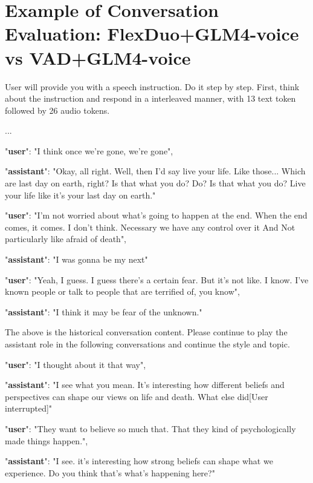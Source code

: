 \documentclass[11pt]{article}
\begin{document}
\section{Example of Conversation Evaluation: FlexDuo+GLM4-voice vs VAD+GLM4-voice}
\label{sec:appendix}
\begin{tcolorbox}[colback=yellow!10, colframe=red!80!black, title=System prompt for GLM4-voice ]
User will provide you with a speech instruction. Do it step by step. First, think about the instruction and respond in a interleaved manner, with 13 text token followed by 26 audio tokens. 

...

    "\textbf{user}": "I think once we're gone, we're gone",
    
    "\textbf{assistant}": "Okay, all right. Well, then I'd say live your life. Like those... Which are last day on earth, right? Is that what you do? Do? Is that what you do? Live your life like it's your last day on earth."

    "\textbf{user}": "I'm not worried about what's going to happen at the end. When the end comes, it comes. I don't think. Necessary we have any control over it And Not particularly like afraid of death",
    
    "\textbf{assistant}": "I was gonna be my next"

    "\textbf{user}": "Yeah, I guess. I guess there's a certain fear. But it's not like. I know. I've known people or talk to people that are terrified of, you know",
    
    "\textbf{assistant}": "I think it may be fear of the unknown."

The above is the historical conversation content. Please continue to play the assistant role in the following conversations and continue the style and topic. 
\end{tcolorbox}

\begin{tcolorbox}[colback=yellow!10, colframe=red!80!black, title=FlexDuo+GLM4-voice]

    "\textbf{user}": "I thought about it that way",
    
    "\textbf{assistant}": "I see what you mean. It's interesting how different beliefs and perspectives can shape our views on life and death. What else did[User interrupted]"
    
    "\textbf{user}": "They want to believe so much that. That they kind of psychologically made things happen.",
    
    "\textbf{assistant}": "I see. it's interesting how strong beliefs can shape what we experience. Do you think that’s what’s happening here?"
    
\end{tcolorbox}
\end{document}
